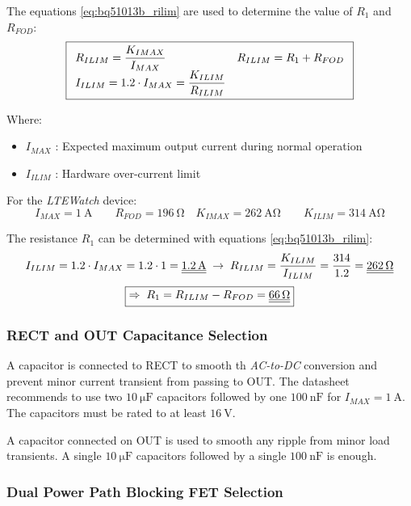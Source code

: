 \documentclass[report.tex]{subfiles}
\begin{document}
The equations \ref{eq:bq51013b_rilim} are used to determine the value of $R_1$ and $R_{FOD}$:
\begin{equation}
\label{eq:bq51013b_rilim}
\boxed{\begin{array}{l l}
R_{ILIM} = \dfrac{K_{IMAX}}{I_{MAX}} & R_{ILIM} = R_1 + R_{FOD}\\
I_{ILIM} = 1.2 \cdot I_{MAX} = \dfrac{K_{ILIM}}{R_{ILIM}}
\end{array}}
\end{equation}

Where:

\begin{itemize}
\item $I_{MAX}$ : Expected maximum output current during normal operation
\item $I_{ILIM}$ : Hardware over-current limit
\end{itemize}

For the \textit{LTEWatch} device:
$$
I_{MAX} = \SI{1}{\ampere} \quad \quad R_{FOD} = \SI{196}{\ohm} \quad
K_{IMAX} = \SI{262}{\ampere\ohm} \quad \quad K_{ILIM} = \SI{314}{\ampere\ohm} 
$$

The resistance $R_1$ can be determined with equations \ref{eq:bq51013b_rilim}:
$$
\begin{array}{c}
	I_{ILIM} = 1.2 \cdot I_{MAX} = 1.2 \cdot 1 = \underline{\underline{\SI{1.2}{\ampere}}} \;\rightarrow \; R_{ILIM} = \dfrac{K_{ILIM}}{I_{ILIM}} = \dfrac{314}{1.2} = \underline{\underline{\SI{262}{\ohm}}}\\[12pt]
	\boxed{\Rightarrow \; R_1 = R_{ILIM}-R_{FOD} = \underline{\underline{\SI{66}{\ohm}}}}
\end{array}
$$

\subsubsection{RECT and OUT Capacitance Selection}

A capacitor is connected to RECT to smooth th \textit{AC-to-DC} conversion and prevent minor current transient from passing to OUT. The datasheet recommends to use two $\SI{10}{\micro\farad}$ capacitors followed by one $\SI{100}{\nano\farad}$ for $I_{MAX} = \SI{1}{\ampere}$. The capacitors must be rated to at least $\SI{16}{\volt}$.

A capacitor connected on OUT is used to smooth any ripple from minor load transients. A single $\SI{10}{\micro\farad}$ capacitors followed by a single $\SI{100}{\nano\farad}$ is enough.

\subsubsection{Dual Power Path Blocking FET Selection}
\end{document}
